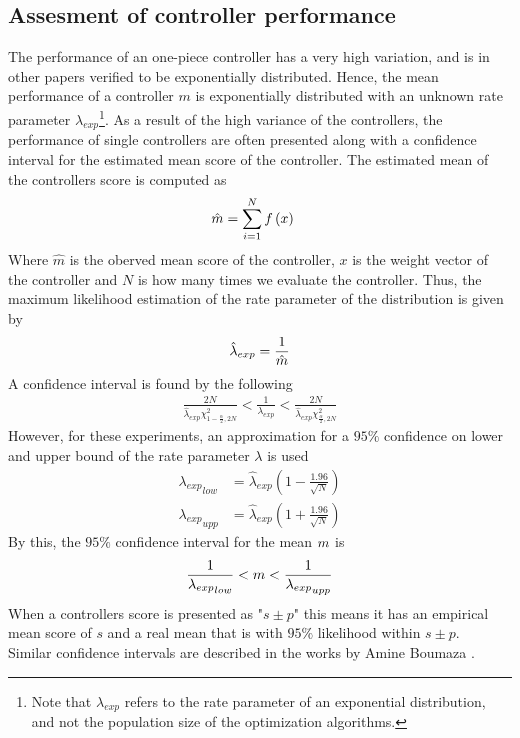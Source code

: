 \subsection{Assesment of controller performance \label{sec:confidenceIntervals}}
The performance of an one-piece controller has a very high variation,
and is in other papers verified to be exponentially distributed. Hence, the mean
performance of a controller $m$ is exponentially distributed with an unknown 
rate parameter  $\lambda_{exp}$\footnote{Note that $\lambda_{exp}$ refers to the rate parameter
of an exponential distribution, and not the population size of the optimization algorithms.}.
As a result of the high variance of the controllers, the performance 
of single controllers are often presented along with a confidence interval
for the estimated mean score of the controller. The estimated mean of 
the controllers score is computed as
\begin{align}
\hat{m} &= \sum_{i=1}^{N} f \left( x \right)
\end{align}
Where $\hat{m}$ is the oberved mean score of the controller, $x$ is the
weight vector of the controller and $N$ is how many times we evaluate the controller.
Thus, the maximum likelihood estimation of the rate 
parameter
of the distribution is given by
\begin{align}
\hat{\lambda}_{exp} = \frac{1}{\hat{m}}
\end{align}
A confidence interval is found by the following
\begin{align}
\frac{2N}{\hat{\lambda}_{exp}\chi^{2}_{1-\frac{\alpha}{2},2N}}
<
\frac{1}{\lambda_{exp}}
< 
\frac{2N}{\hat{\lambda}_{exp}\chi^{2}_{\frac{\alpha}{2},2N}}
\end{align}
However, for these experiments, an approximation for a $95\%$
confidence on lower and upper bound 
of the rate parameter $\lambda$ is used
\begin{align}
{\lambda_{exp}}_{low} &= 
\hat{\lambda}_{exp} \left( 1 - \frac{1.96}{\sqrt{N}} \right)\\
{\lambda_{exp}}_{upp} &= 
\hat{\lambda}_{exp} \left( 1 + \frac{1.96}{\sqrt{N}} \right)
\end{align}
By this, the $95\%$ confidence interval for the mean $m$ is
\begin{align}
\frac{1}{{\lambda_{exp}}_{low}} < m < \frac{1}{{\lambda_{exp}}_{upp}}
\end{align}
When a controllers score is presented as "$s \pm p$" this means 
it has an empirical mean score of $s$ and a real mean that is with 
$95\%$ likelihood within $s \pm p$. \\
Similar confidence intervals are described in the works by Amine Boumaza \citep{boumaza2009}.
